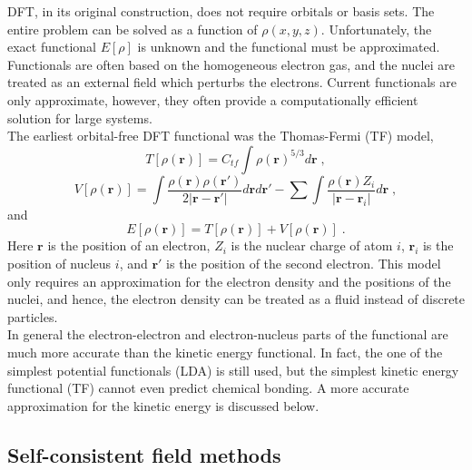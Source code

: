 \documentclass[12pt]{report}
\begin{document}
DFT, in its original construction, does not require orbitals or basis sets.
The entire problem can be solved as a function of $\rho(x,y,z)$.
Unfortunately, the exact functional $E[\rho]$ is unknown and the functional
must be approximated. Functionals are often based on the homogeneous electron
gas, and the nuclei are treated as an external field which perturbs the
electrons. Current functionals are only approximate, however, they often
provide a computationally efficient solution for large systems. \\

The earliest orbital-free DFT functional was the Thomas-Fermi (TF) model,
\begin{equation}
 T[\rho(\textbf{r})] = C_{tf}\int \rho(\textbf{r})^{5/3}d\textbf{r} \; ,
\end{equation}
\begin{equation}
 V[\rho(\textbf{r})] = \int
 \frac{\rho(\textbf{r})\rho(\textbf{r}')}{2|\textbf{r}-\textbf{r}'|}
 d\textbf{r}d\textbf{r}'
 -\sum \int \frac{\rho(\textbf{r})Z_i}{|\textbf{r}-\textbf{r}_i|} d\textbf{r}
 \; ,
\end{equation}
and
\begin{equation}
 E[\rho(\textbf{r})] = T[\rho(\textbf{r})]+V[\rho(\textbf{r})] \; .
\end{equation}
Here $\textbf{r}$ is the position of an electron, $Z_i$ is the nuclear charge
of atom $i$, $\textbf{r}_i$ is the position of nucleus $i$, and $\textbf{r}'$
is the position of the second electron. This model only requires an
approximation for the electron density and the positions of the nuclei, and
hence, the electron density can be treated as a fluid instead of discrete
particles. \\

In general the electron-electron and electron-nucleus parts of the functional
are much more accurate than the kinetic energy functional. In fact, the one of
the simplest potential functionals (LDA) is still used, but the simplest
kinetic energy functional (TF) cannot even predict chemical bonding. A more
accurate approximation for the kinetic energy is discussed below.

\subsection{Self-consistent field methods}
\end{document}
